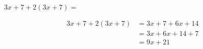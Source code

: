$3x + 7 + 2(3x + 7)  =$

\begin{solutionbox}{3cm}
    \begin{align*}
        3x + 7 + 2(3x + 7) & =3x + 7 + 6x + 14 \\
                           & =3x +6x   +14 +7  \\
                           & =9x +21           \\
    \end{align*}
\end{solutionbox}